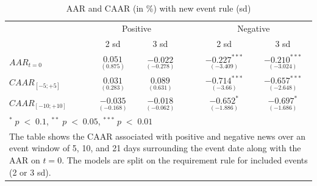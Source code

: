 \begin{table}[H]
\centering
\caption{AAR and CAAR (in \%) with new event rule (sd)} 
\begin{tabular}{lccccc}
  \hline  \hline
  & \multicolumn{2}{c}{Positive} &  & \multicolumn{2}{c}{Negative}\\ \cline{2-3} \cline{5-6}  
  & 2 sd & 3 sd & & 2 sd & 3 sd   \\   
 \hline
$AAR_{t=0}$ & $\underset{(0.875)}{0.051}$ & $\underset{(-0.278)}{-0.022}$ & & $\underset{(-3.409)}{-0.227^{***}}$ & $\underset{(-3.024)}{-0.210^{***}}$ \\ 
$CAAR_{[-5;+5]}$  & $\underset{(0.283)}{0.031}$  & $\underset{(0.631)}{0.089}$ & & $\underset{(-3.66)}{-0.714^{***}}$ & $\underset{(-2.648)}{-0.657^{***}}$ \\ 
$CAAR_{[-10;+10]}$  & $\underset{(-0.168)}{-0.035}$  & $\underset{(-0.062)}{-0.018}$ &  & $\underset{(-1.886)}{-0.652^{*}}$ & $\underset{(-1.686)}{-0.697^{*}}$  \\
   \hline \hline
   \multicolumn{6}{p{12cm}}{ \footnotesize $^* \; p\; <\; 0.1$, $ ^{**} \; p\; <\; 0.05$, $ ^{***} \; p\; <\; 0.01$  } \\
   \multicolumn{6}{p{13cm}}{\footnotesize The table shows the CAAR associated with positive and negative news over an event window of 5, 10, and 21 days surrounding the event date along with the AAR on $t=0$. The models are split on the requirement rule for included events (2 or 3 sd).} \\
   \hline
\end{tabular}
\label{tab:ST_sensitivity}
\end{table}

